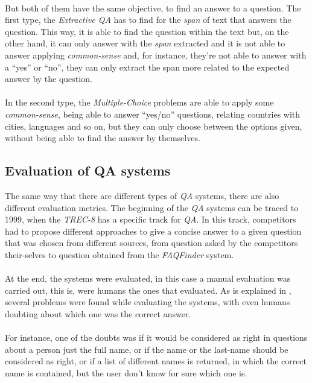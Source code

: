\paragraph{}
But both of them have the same objective, to find an answer to a question. The first type, the \emph{Extractive QA} has to find for the \emph{span} of text that answers the question. This way, it is able to find the question within the text but, on the other hand, it can only answer with the \emph{span} extracted and it is not able to answer applying \emph{common-sense} and, for instance, they're not able to answer with a ``yes'' or ``no'', they can only extract the span more related to the expected answer by the question.
\paragraph{}
In the second type, the \emph{Multiple-Choice} problems are able to apply some \emph{common-sense}, being able to answer ``yes/no'' questions, relating countries with cities, languages and so on, but they can only choose between the options given, without being able to find the answer by themselves.
\subsection{Evaluation of QA systems}
\label{sec:qa-evaluation}
The same way that there are different types of \emph{QA} systems, there are also different evaluation metrics. The beginning of the \emph{QA} systems can be traced to 1999, when the \emph{TREC-8} has a specific track for \emph{QA}. In this track, competitors had to propose different approaches to give a concise answer to a given question that was chosen from different sources, from question asked by the competitors their-selves to question obtained from the \emph{FAQFinder} system.
\paragraph{}
At the end, the systems were evaluated, in this case a manual evaluation was carried out, this is, were humans the ones that evaluated. As is explained in \cite{Voorhees1999}, several problems were found while evaluating the systems, with even humans doubting about which one was the correct answer.
\paragraph{}
For instance, one of the doubts was if it would be considered as right in questions about a person just the full name, or if the name or the last-name should be considered as right, or if a list of different names is returned, in which the correct name is contained, but the user don't know for sure which one is.
